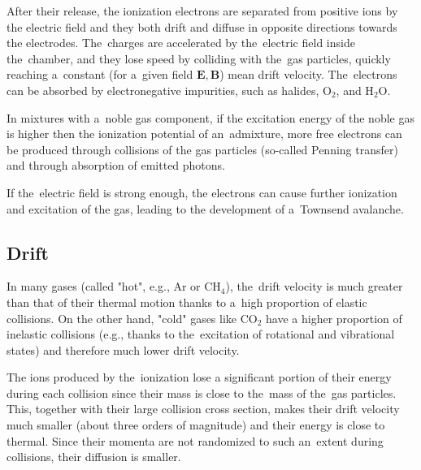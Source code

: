 		After their release, the ionization electrons are separated from positive ions by the electric field and they both drift and diffuse in opposite directions towards the electrodes. The~charges are accelerated by the~electric field inside the~chamber, and they lose speed by colliding with the~gas particles, quickly reaching a~constant (for a~given field $\mathbf{E}, \mathbf{B}$) mean drift velocity. The~electrons can be absorbed by electronegative impurities, such as halides, O$_2$, and H$_2$O.
		
		In mixtures with a~noble gas component, if the excitation energy of the noble gas is higher then the ionization potential of an~admixture, more free electrons can be produced through collisions of the gas particles (so\nobreakdash-called Penning transfer) and through absorption of emitted photons.
		
		If the~electric field is strong enough, the electrons can cause further ionization and excitation of the gas, leading to the development of a~Townsend avalanche.
	
		\subsection{Drift}			
			In many gases (called "hot", e.g., Ar or CH$_4$), the~drift velocity is much greater than that of their thermal motion thanks to a~high proportion of elastic collisions. On the other hand, "cold" gases like CO$_2$ have a higher proportion of inelastic collisions (e.g., thanks to the~excitation of rotational and vibrational states) and therefore much lower drift velocity.
			
			The ions produced by the~ionization lose a significant portion of their energy during each collision since their mass is close to the~mass of the~gas particles. This, together with their large collision cross section, makes their drift velocity much smaller (about three orders of magnitude) and their energy is close to thermal. Since their momenta are not randomized to such an~extent during collisions, their diffusion is smaller.
			
